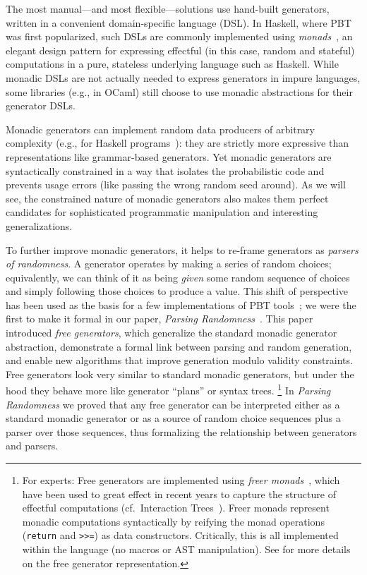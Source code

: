 The most manual---and most flexible---solutions use hand-built
generators, written in a convenient domain-specific language (DSL).
In  Haskell, where PBT was
first popularized, such DSLs are commonly implemented using {\em
monads\/}~\cite{moggi1991notions}, an elegant design pattern for
expressing effectful (in this case, random and stateful) computations
in a pure, stateless underlying
language such as Haskell. While monadic DSLs are not actually
needed to express generators in
impure languages, some libraries (e.g., in OCaml) still choose to use monadic
abstractions for their generator DSLs.

Monadic generators can implement random data producers of arbitrary complexity
(e.g., for Haskell
programs~\cite{palka_testing_2011}): they are strictly more expressive than
representations like grammar-based generators.  Yet monadic generators are
syntactically constrained in a way that isolates the probabilistic code and
prevents usage errors (like passing the wrong random seed around). As we will
see, the constrained nature of monadic generators also makes them perfect
candidates for sophisticated programmatic manipulation and interesting
generalizations.

To further improve monadic generators, it helps to re-frame generators as {\em
  parsers of randomness}. A generator
operates by making a series of random choices; equivalently, we can think of
it as being {\em given} some random sequence of choices and simply following
those choices to produce a value. This shift of perspective has been
used as the basis for a few implementations of PBT
tools~\cite{maciver2019hypothesis, dolan2017testing}; we were the
first to make it
formal in our paper, {\em Parsing Randomness}~\cite{goldstein2022parsing}.
%
This paper introduced {\em free generators}, which generalize the standard
monadic generator abstraction, demonstrate a formal link between parsing and
random generation, and enable new algorithms that improve
generation modulo validity constraints. Free generators look very
similar to standard monadic generators, but under the hood they behave more like
generator ``plans'' or syntax trees.%
\footnote{For experts: Free generators are implemented using {\em freer
monads}~\cite{kiselyov2015freer}, which have been used to great effect in recent
years to capture the structure of effectful computations
(cf.~Interaction Trees~\cite{old:xia2019interaction}). Freer monads represent
monadic computations syntactically by reifying the monad operations
(\lstinline{return} and \lstinline{>>=}) as data constructors. Critically, this
is all implemented within the language (no macros or AST
manipulation). See \cite{goldstein2022parsing} for more details on the
free generator representation.}
In {\em Parsing Randomness} we proved that any free
generator can be interpreted
either as a standard monadic generator or as a source of
random choice sequences plus a parser over those sequences, thus formalizing the
relationship between generators and parsers.

